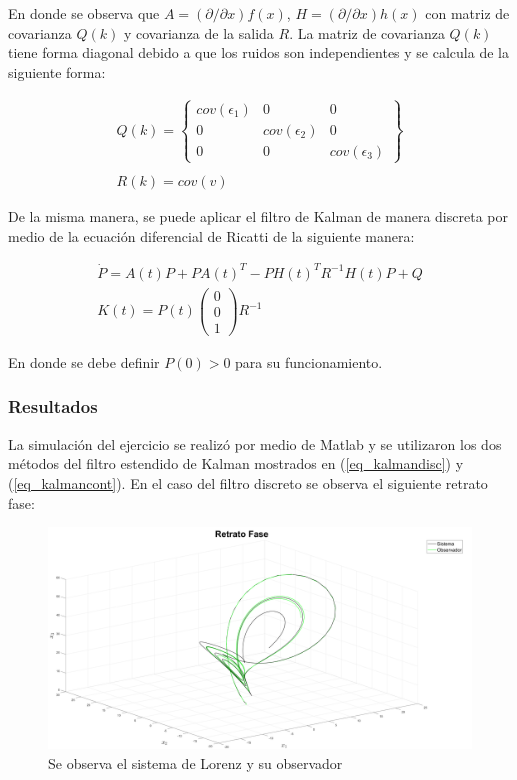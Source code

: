 En donde se observa que $A = (\partial/\partial x)f(x)$, $H = (\partial/\partial x)h(x)$ con matriz de covarianza $Q(k)$ y covarianza de la salida $R$. La matriz de covarianza $Q(k)$ tiene forma diagonal debido a que los ruidos son independientes y se calcula de la siguiente forma:

\begin{equation}
	\begin{array}{l}
		Q(k) = \begin{Bmatrix}
		cov(\epsilon_1) & 0 & 0\\
		0 & cov(\epsilon_2) & 0\\
		0 & 0 & cov(\epsilon_3)
		\end{Bmatrix}\\
		\\
		R(k) = cov(v)
	\end{array}
\end{equation}

De la misma manera, se puede aplicar el filtro de Kalman de manera discreta por medio de la ecuación diferencial de Ricatti de la siguiente manera:

\begin{equation}\label{eq_kalmancont}
	\begin{array}{l}
	\dot{P} = A(t)P + PA(t)^T - PH(t)^TR^{-1}H(t)P + Q\\
	K(t) = P(t)\begin{pmatrix}
	0 \\ 0 \\ 1
	\end{pmatrix}R^{-1}
	\end{array}
\end{equation}

En donde se debe definir $P(0) > 0$ para su funcionamiento.

\subsubsection*{Resultados}

La simulación del ejercicio se realizó por medio de Matlab y se utilizaron los dos métodos del filtro estendido de Kalman mostrados en (\ref{eq_kalmandisc}) y (\ref{eq_kalmancont}). En el caso del filtro discreto se observa el siguiente retrato fase:

\begin{figure}[H]
	\centering
	\includegraphics[width=150mm]{img/E1_RetratoFase_Disc.png}
	\caption{Se observa el sistema de Lorenz y su observador}
	\label{img:lorenzD1}
\end{figure}

